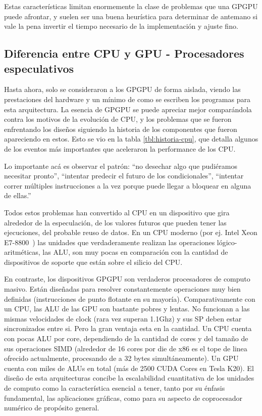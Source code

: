 Estas caracter\'isticas limitan enormemente la clase de problemas que una GPGPU puede
afrontar, y suelen ser una buena heur\'istica para determinar de antemano si vale la pena
invertir el tiempo necesario de la implementaci\'on y ajuste fino.


\subsection{Diferencia entre CPU y GPU - Procesadores especulativos}
Hasta ahora, solo se consideraron a los GPGPU de forma aislada, viendo las prestaciones del hardware y un m\'inimo
de como se escriben los programas para esta arquitectura. La esencia de GPGPU se puede apreciar mejor
compar\'andola contra los motivos de la evoluci\'on de CPU, y los problemas que se fueron enfrentando
los dise\~nos siguiendo la historia de los componentes que fueron apareciendo en estos. Esto se vio
en la tabla \ref{tbl:historia-cpu}, que detalla algunos de los eventos m\'as importantes que aceleraron
la performance de los CPU.

Lo importante ac\'a es observar el patr\'on: ``no desechar algo que pudi\'eramos necesitar pronto'',
``intentar predecir el futuro de los condicionales'', ``intentar correr m\'ultiples instrucciones a la vez
porque puede llegar a bloquear en alguna de ellas.''

Todos estos problemas han convertido al CPU en un dispositivo que gira alrededor de la especulaci\'on,
de los valores futuros que pueden tener las ejecuciones, del probable reuso de datos.
En un CPU moderno (por ej. Intel Xeon E7-8800~\cite{XeonE78800Spec}) las unidades que verdaderamente realizan las operaciones l\'ogico-aritm\'eticas,
las ALU, son muy pocas en comparaci\'on con la cantidad de dispositivos de soporte que est\'an
sobre el silicio del CPU.

En contraste, los dispositivos GPGPU son verdaderos procesadores de computo masivo. Est\'an dise\~nadas para
resolver constantemente operaciones muy bien definidas (instrucciones de punto flotante en su mayor\'ia).
Comparativamente con un CPU, las ALU de las GPU son bastante pobres y lentas. No funcionan a las mismas
velocidades de clock (rara vez superan 1.1Ghz) y sus SP deben estar sincronizados entre si. Pero la gran ventaja esta en la cantidad.
Un CPU cuenta con pocas ALU por core, dependiendo de la cantidad de cores y del tama\~no de sus operaciones SIMD
(alrededor de 16 cores por die de x86 es el tope de linea ofrecido actualmente, procesando de a 32 bytes simult\'aneamente).
Un GPU cuenta con miles de ALUs en total (m\'as de 2500 CUDA Cores en Tesla K20). El dise\~no de esta
arquitecturas concibe la escalabilidad cuantitativa de los unidades de computo como la caracter\'istica esencial a tener,
tanto por su \'enfasis fundamental, las aplicaciones gr\'aficas, como para su aspecto de coprocesador num\'erico
de prop\'osito general.

